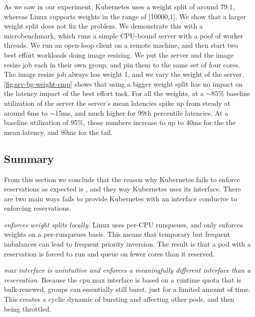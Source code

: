 As we saw in our experiment, Kubernetes uses a weight split of around 79:1,
whereas Linux supports weights in the range of [10000,1]. We show that a larger
weight split does not fix the problem. We demonstrate this with a
microbenchmark, which runs a simple CPU-bound server with a pool of worker
threads. We run an open-loop client on a remote machine, and then start two best
effort workloads doing image resizing. We put the server and the image resize
job each in their own \cgroups{} group, and pin them to the same set of four
cores. The image resize job always has weight 1, and we vary the weight of the
server. \autoref{fig:srv-bg-weight-cmp} shows that using a bigger weight split
has no impact on the latency impact of the best effort task. For all the
weights, at a $\sim$85\% baseline utilization of the server the server's mean
latencies spike up from steady at around 6ms to $\sim$15ms, and much higher for
99th percentile latencies. At a baseline utilization of 95\%, those numbers
increase to up to 40ms for the the mean latency, and 80ms for the tail.

\subsection{Summary}

From this section we conclude that the reason why Kubernetes fails to enforce
reservations as expected is \cgroups{}, and they way Kubernetes uses its
interface. There are two main ways \cgroups{} fails to provide Kubernetes with
an interface conducive to enforcing reservations.

\textit{\cgroups{} enforces weight splits locally.} Linux uses per-CPU
runqueues, and only enforces weights on a per-runqueues basis. This means that
temporary but frequent imbalances can lead to frequent priority inversion. The
result is that a pod with a reservation is forced to run and queue on fewer
cores than it reserved.

\textit{\cgroups{} max interface is unintuitive and enforces a meaningfully
different interface than a reservation.} Because the cpu.max interface is based
on a runtime quota that is bulk-renewed, groups can essentially still burst,
just for a limited amount of time. This creates a cyclic dynamic of bursting and
affecting other pods, and then being throttled.



